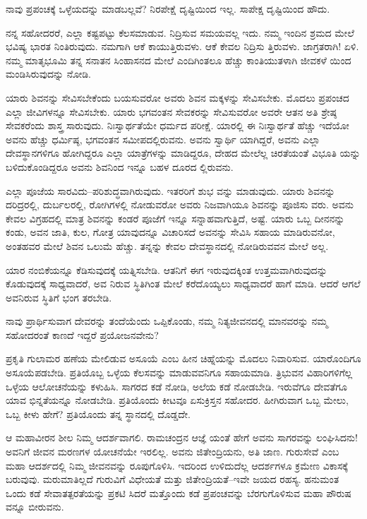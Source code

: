 ನಾವು ಪ್ರಪಂಚಕ್ಕೆ ಒಳ್ಳೆಯದನ್ನು ಮಾಡಬಲ್ಲವೆ? ನಿರಪೇಕ್ಷೆ ದೃಷ್ಟಿಯಿಂದ ಇಲ್ಲ. ಸಾಪೇಕ್ಷ ದೃಷ್ಟಿಯಿಂದ ಹೌದು.

ನನ್ನ ಸಹೋದರರೆ, ಎಲ್ಲಾ ಕಷ್ಟಪಟ್ಟು ಕೆಲಸಮಾಡುವ. ನಿದ್ರಿಸುವ ಸಮಯವಲ್ಲ ಇದು. ನಮ್ಮ ಇಂದಿನ ಶ್ರಮದ ಮೇಲೆ ಭವಿಷ್ಯ ಭಾರತ ನಿಂತಿರುವುದು. ನಮಗಾಗಿ ಆಕೆ ಕಾಯುತ್ತಿರುವಳು. ಆಕೆ ಕೇವಲ ನಿದ್ರಿಸು ತ್ತಿರುವಳು. ಜಾಗ್ರತರಾಗಿ! ಏಳಿ. ನಮ್ಮ ಮಾತೃಭೂಮಿ ತನ್ನ ಸನಾತನ ಸಿಂಹಾಸನದ ಮೇಲೆ ಎಂದಿಗಿಂತಲೂ ಹೆಚ್ಚು ಕಾಂತಿಯುತಳಾಗಿ ಜೀವಕಳೆ ಯಿಂದ ಮಂಡಿಸಿರುವುದನ್ನು ನೋಡಿ.

ಯಾರು ಶಿವನನ್ನು ಸೇವಿಸಬೇಕೆಂದು ಬಯಸುವರೋ ಅವರು ಶಿವನ ಮಕ್ಕಳನ್ನು ಸೇವಿಸಬೇಕು. ಮೊದಲು ಪ್ರಪಂಚದ ಎಲ್ಲಾ ಜೀವಿಗಳನ್ನೂ ಸೇವಿಸಬೇಕು. ಯಾರು ಭಗವಂತನ ಸೇವಕರನ್ನು ಸೇವಿಸುವರೋ ಅವರೇ ಆತನ ಅತಿ ಶ್ರೇಷ್ಠ ಸೇವಕರೆಂದು ಶಾಸ್ತ್ರ ಸಾರುವುದು. ನಿಃಸ್ವಾರ್ಥತೆಯೇ ಧರ್ಮದ ಪರೀಕ್ಷೆ. ಯಾರಲ್ಲಿ ಈ ನಿಃಸ್ವಾರ್ಥತೆ ಹೆಚ್ಚು ಇದೆಯೋ ಅವನು ಹೆಚ್ಚು ಧರ್ಮಿಷ್ಠ, ಭಗವಂತನ ಸಮೀಪದಲ್ಲಿರುವನು. ಅವನು ಸ್ವಾರ್ಥಿ ಯಾಗಿದ್ದರೆ, ಅವನು ಎಲ್ಲಾ ದೇವಸ್ಥಾನಗಳಿಗೂ ಹೋಗಿದ್ದರೂ ಎಲ್ಲಾ ಯಾತ್ರೆಗಳನ್ನು ಮಾಡಿದ್ದರೂ, ದೇಹದ ಮೇಲೆಲ್ಲ ಚಿರತೆಯಂತೆ ವಿಭೂತಿ ಯನ್ನು ಬಳಿದುಕೊಂಡಿದ್ದರೂ ಅವನು ಶಿವನಿಂದ ಇನ್ನೂ ಬಹಳ ದೂರದ ಲ್ಲಿರುವನು.

ಎಲ್ಲಾ ಪೂಜೆಯ ಸಾರವಿದು–ಪರಿಶುದ್ಧವಾಗಿರುವುದು. ಇತರರಿಗೆ ಶುಭ ವನ್ನು ಮಾಡುವುದು. ಯಾರು ಶಿವನನ್ನು ದರಿದ್ರರಲ್ಲಿ, ದುರ್ಬಲರಲ್ಲಿ, ರೋಗಿಗಳಲ್ಲಿ ನೋಡುವರೋ ಅವರು ನಿಜವಾಗಿಯೂ ಶಿವನನ್ನು ಪೂಜಿಸು ವರು. ಅವನು ಕೇವಲ ವಿಗ್ರಹದಲ್ಲಿ ಮಾತ್ರ ಶಿವನನ್ನು ಕಂಡರೆ ಪೂಜೆಗೆ ಇನ್ನೂ ಸನ್ನಾಹವಾಗುತ್ತಿದೆ, ಅಷ್ಟೆ. ಯಾರು ಒಬ್ಬ ದೀನನನ್ನು ಕಂಡು, ಅವನ ಜಾತಿ, ಕುಲ, ಗೋತ್ರ ಯಾವುದನ್ನೂ ವಿಚಾರಿಸದೆ ಅವನನ್ನು ಸೇವಿಸಿ ಸಹಾಯ ಮಾಡಿರುವನೋ, ಅಂತಹವರ ಮೇಲೆ ಶಿವನ ಒಲುಮೆ ಹೆಚ್ಚು. ತನ್ನನ್ನು ಕೇವಲ ದೇವಸ್ಥಾನದಲ್ಲಿ ನೋಡಿರುವವನ ಮೇಲೆ ಅಲ್ಲ.

ಯಾರ ನಂಬಿಕೆಯನ್ನೂ ಕೆಡಿಸುವುದಕ್ಕೆ ಯತ್ನಿಸಬೇಡಿ. ಆತನಿಗೆ ಈಗ ಇರುವುದಕ್ಕಿಂತ ಉತ್ತಮವಾಗಿರುವುದನ್ನು ಕೊಡುವುದಕ್ಕೆ ಸಾಧ್ಯವಾದರೆ, ಅವ ನಿರುವ ಸ್ಥಿತಿಗಿಂತ ಮೇಲೆ ಕರೆದೊಯ್ಯಲು ಸಾಧ್ಯವಾದರೆ ಹಾಗೆ ಮಾಡಿ. ಆದರೆ ಆಗಲೆ ಅವನಿರುವ ಸ್ಥಿತಿಗೆ ಭಂಗ ತರಬೇಡಿ.

ನಾವು ಪ್ರಾರ್ಥಿಸುವಾಗ ದೇವರನ್ನು ತಂದೆಯೆಂದು ಒಪ್ಪಿಕೊಂಡು, ನಮ್ಮ ನಿತ್ಯಜೀವನದಲ್ಲಿ ಮಾನವರನ್ನು ನಮ್ಮ ಸಹೋದರಂತೆ ಕಾಣದೆ ಇದ್ದರೆ ಪ್ರಯೋಜನವೇನು?

ಪ್ರಕೃತಿ ಗುಲಾಮರ ಹಣೆಯ ಮೇಲಿಡುವ ಅಸೂಯೆ ಎಂಬ ಹೀನ ಚಿಹ್ನೆಯನ್ನು ಮೊದಲು ನಿವಾರಿಸುವ. ಯಾರೊಂದಿಗೂ ಅಸೂಯೆಪಡಬೇಡಿ. ಪ್ರತಿಯೊಬ್ಬ ಒಳ್ಳೆಯ ಕೆಲಸವನ್ನು ಮಾಡುವವನಿಗೂ ಸಹಾಯಮಾಡಿ. ತ್ರಿಭುವನ ವಿಹಾರಿಗಳಿಗೆಲ್ಲ ಒಳ್ಳೆಯ ಆಲೋಚನೆಯನ್ನು ಕಳುಹಿಸಿ. ಸಾಗರದ ಕಡೆ ನೋಡಿ, ಅಲೆಯ ಕಡೆ ನೋಡಬೇಡಿ. ಇರುವೆಗೂ ದೇವತೆಗೂ ಯಾವ ಭಿನ್ನತೆಯನ್ನೂ ನೋಡಬೇಡಿ. ಪ್ರತಿಯೊಂದು ಕೀಟವೂ ಏಸುಕ್ರಿಸ್ತನ ಸಹೋದರ. ಹೀಗಿರುವಾಗ ಒಬ್ಬ ಮೇಲು, ಒಬ್ಬ ಕೀಳು ಹೇಗೆ? ಪ್ರತಿಯೊಂದು ತನ್ನ ಸ್ಥಾನದಲ್ಲಿ ದೊಡ್ಡದೇ.

ಆ ಮಹಾವೀರನ ಶೀಲ ನಿಮ್ಮ ಆದರ್ಶವಾಗಲಿ. ರಾಮಚಂದ್ರನ ಆಜ್ಞೆ ಯಂತೆ ಹೇಗೆ ಅವನು ಸಾಗರವನ್ನು ಲಂಘಿಸಿದನು! ಅವನಿಗೆ ಜೀವನ ಮರಣಗಳ ಯೋಚನೆಯೇ ಇರಲಿಲ್ಲ. ಅವನು ಜಿತೇಂದ್ರಿಯನು, ಅತಿ ಜಾಣ. ಗುರುಸೇವೆ ಎಂಬ ಮಹಾ ಆದರ್ಶದಲ್ಲಿ ನಿಮ್ಮ ಜೀವನವನ್ನು ರೂಪುಗೊಳಿಸಿ. ಇದರಿಂದ ಉಳಿದುದೆಲ್ಲ ಆದರ್ಶಗಳೂ ಕ್ರಮೇಣ ವಿಕಾಸಕ್ಕೆ ಬರುವುವು. ಮರುಮಾತಿಲ್ಲದೆ ಗುರುವಿಗೆ ವಿಧೇಯತೆ ಮತ್ತು ಜಿತೇಂದ್ರಿಯತೆ–ಇವೇ ಜಯದ ರಹಸ್ಯ. ಹನುಮಂತ ಒಂದು ಕಡೆ ಸೇವಾತತ್ಪರತೆಯನ್ನು ಪ್ರಕಟಿ ಸಿದರೆ ಮತ್ತೊಂದು ಕಡೆ ಪ್ರಪಂಚವನ್ನು ಬೆರಗುಗೊಳಿಸುವ ಮಹಾ ಪೌರುಷ ವನ್ನೂ ಬೀರುವನು.


